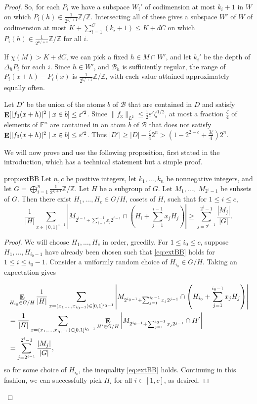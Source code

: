 \documentclass{article}
\theoremstyle{plain}
\theoremstyle{definition}
\theoremstyle{definition}
\theoremstyle{remark}
\numberwithin{equation}{section}
\newcommand{\FF}{\mathbb{F}}
\newcommand{\ZZ}{\mathbb{Z}}
\newcommand{\Esymb}{{\bf E}}
\DeclareMathOperator*{\E}{\Esymb}
\newcommand{\cB}{\mathcal B}
\begin{document}
\begin{proof}
So, for each $P_i$ we have a subspace $W_i'$ of codimension at most $k_i+1$ in $W$ on which $P_i(h)\in \frac{1}{2^{k_i'+1}}\ZZ/\ZZ$. Intersecting all of these gives a subspace $W'$ of $W$ of codimension at most $K+\sum_{i=1}^C (k_i+1)\leq K+dC$ on which $P_i(h)\in \frac{1}{2^{k_i'+1}}\ZZ/\ZZ$ for all $i$.

If $\chi(M)>K+dC$, we can pick a fixed $h\in M\cap W'$, and let $k_i'$ be the depth of $\Delta_h P_i$ for each $i$. Since $h\in W'$, and $\cB_h$ is sufficiently regular, the range of $P_i(x+h)-P_i(x)$ is $\frac{1}{2^{k_i'+1}}\ZZ/\ZZ$, with each value attained approximately equally often.

Let $D'$ be the union of the atoms $b$ of $\cB$ that are contained in $D$ and satisfy $\E[|f_3(x+h)|^2 \mid x\in b]\leq \varepsilon'^2$. Since $\|f_3\|_{L^2}\leq \frac{1}{2}\varepsilon'\zeta^{1/2}$, at most a fraction $\frac{\zeta}{4}$ of elements of $\FF^n$ are contained in an atom $b$ of $\cB$ that does not satisfy $\E[|f_3(x+h)|^2 \mid x\in b]\leq \varepsilon'^2$. Thus $|D'|\geq |D|-\frac{\zeta}{4}2^n > (1-2^{2-c}+\frac{3\zeta}{4})2^n$.

We will now prove and use the following proposition, first stated in the introduction, which has a technical statement but a simple proof.

\begin{repprop}{prop:extBB}
Let $n,c$ be positive integers, let $k_1,\dots,k_n$ be nonnegative integers, and let $G = \bigoplus_{i=1}^n \frac{1}{2^{k_i+1}}\ZZ/\ZZ$. Let $H$ be a subgroup of $G$. Let $M_1,\dots,$ $M_{2^c-1}$ be subsets of $G$. Then there exist $H_1,\dots,H_c\in G/H$, cosets of $H$, such that for $1\leq i\leq c$,
\begin{equation}
\label{eq:extBB}
    \frac{1}{|H|}\sum_{x\in[0,1]^{i-1}} \left | M_{2^{i-1}+\sum_{j=1}^{i-1} x_j 2^{j-1}}\cap \left( H_i + \sum_{j=1}^{i-1} x_j H_j \right ) \right | \geq \sum_{j=2^{i-1}}^{2^i-1}\frac{|M_j|}{|G|}.\tag{$*$}
\end{equation}
\end{repprop}

\begin{proof}
We will choose $H_1,\dots,H_c$ in order, greedily. For $1\leq i_0\leq c$, suppose $H_1,\dots,H_{i_0-1}$ have already been chosen such that \eqref{eq:extBB} holds for $1\leq i \leq i_0-1$.
Consider a uniformly random choice of $H_{i_0}\in G/H$. Taking an expectation gives

\begin{align*}
    & \E_{H_{i_0}\in G/H}\frac{1}{|H|}\sum_{x=(x_1,\dots,x_{i_0-1})\in[0,1]^{i_0-1}} \left | M_{2^{i_0-1}+\sum_{j=1}^{i_0-1} x_j 2^{j-1}}\cap \left( H_{i_0} + \sum_{j=1}^{i_0-1} x_j H_j \right ) \right | \\
    &= \frac{1}{|H|}\sum_{x=(x_1,\dots,x_{i_0-1})\in[0,1]^{i_0-1}} \E_{H'\in G/H}\left | M_{2^{i_0-1}+\sum_{j=1}^{i_0-1} x_j 2^{j-1}}\cap H' \right | \\
    &= \sum_{j=2^{i-1}}^{2^i-1}\frac{|M_j|}{|G|},
\end{align*}
so for some choice of $H_{i_0}$, the inequality \eqref{eq:extBB} holds. Continuing in this fashion, we can successfully pick $H_i$ for all $i\in [1,c]$, as desired.


\end{proof}
\end{proof}
\end{document}
